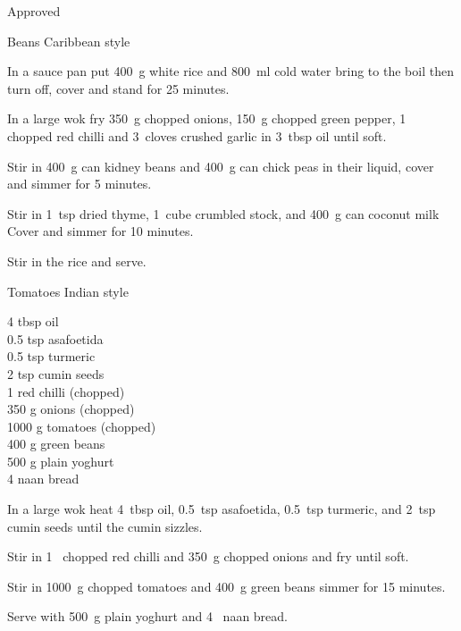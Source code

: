\begin{menu}{Approved}
\begin{recipe}{2}{Beans Caribbean style}
    \begin{instructions}
    \item 
      In a
      sauce pan
      put
      400~g  white rice
      and
      800~ml  cold water
      bring to the boil then turn off, cover and stand for 25 minutes.
    \item 
        In a large wok fry
        350~g chopped onions,
        150~g chopped green pepper,
        1~ chopped red chilli
        and
        3~cloves crushed garlic
        in
        3~tbsp  oil
        until soft.
      \item 
        Stir in
        400~g  can kidney beans
        and
        400~g  can chick peas
        in their liquid,
        cover and simmer for 5 minutes.
      \item 
        Stir in
        1~tsp  dried thyme,
        1~cube crumbled stock,
        and
        400~g  can coconut milk
        Cover and simmer for 10 minutes.
      \item 
        Stir in the rice and serve.
      
    \end{instructions}
    \end{recipe}%
  
    \begin{recipe}{2}{Tomatoes Indian style}%
    
		\begin{ingredients}
		4 tbsp oil  \\
	0.5 tsp asafoetida  \\
	0.5 tsp turmeric  \\
	2 tsp cumin seeds  \\
	1  red chilli (chopped) \\
	350 g onions (chopped) \\
	1000 g tomatoes (chopped) \\
	400 g green beans  \\
	500 g plain yoghurt  \\
	4  naan bread  \\
	
		\end{ingredients}
	
	
    \begin{instructions}
    \item 
        In a large wok heat
        4~tbsp  oil,
        0.5~tsp  asafoetida,
        0.5~tsp  turmeric,
        and
        2~tsp  cumin seeds
        until
        the cumin sizzles.
      \item 
        Stir in
        1~ chopped red chilli
        and
        350~g chopped onions
        and
        fry until soft.
      \item 
        Stir in
        1000~g chopped tomatoes
        and
        400~g  green beans
        simmer for 15 minutes.
      \item 
        Serve with
        500~g  plain yoghurt
        and
        4~  naan bread.
      

\end{instructions}
\end{recipe}
\end{menu}
